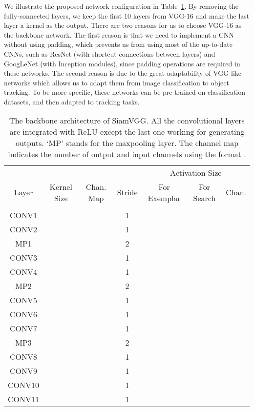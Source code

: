 \documentclass[runningheads]{llncs}
\begin{document}
We illustrate the proposed network configuration in Table~\ref{table:siamvgg}. By removing the fully-connected layers, we keep the first 10 layers from VGG-16 and 
make the last layer a  kernel as the output. There are two reasons for us to choose VGG-16 as the backbone network. The first reason is that we need to implement a CNN without using padding, which prevents us from using most of the up-to-date CNNs, such as ResNet (with shortcut connections between layers) and GoogLeNet (with Inception modules), since padding operations are required in these networks. 
The second reason is due to the great adaptability of VGG-like networks which allows us to adapt them from image classification to object tracking. To be more specific, these networks can be pre-trained on classification datasets, and then adapted to tracking tasks. 
\setlength{\tabcolsep}{4pt}
\begin{table}[t]
\begin{center}
\caption{The backbone architecture of SiamVGG. All the convolutional layers are integrated with ReLU except the last one working for generating outputs. `MP' stands for the maxpooling layer. The channel map indicates the number of output and input channels using the format .}
\label{table:siamvgg}
  \begin{tabular}{ccccccc}
    \toprule
    
       \quad& \quad & \quad
      & \quad &
      \multicolumn{3}{c}{Activation Size} \\
     Layer & Kernel Size & Chan. Map & Stride & For Exemplar & For Search & Chan. \\
      \midrule
    \quad  & \quad        & \quad            & \quad &  &  &  \\
    CONV1  &  &     & 1     &  &  &  \\
    CONV2  &  &    & 1     &  &  &  \\
    MP1    &  & \quad            & 2     &  &  &  \\
    CONV3  &  &   & 1     &  &  &  \\
    CONV4  &  &  & 1     &  &  &  \\
    MP2    &  & \quad            & 2     &  &  &  \\
    CONV5  &  &  & 1     &  &  &  \\
    CONV6  &  &  & 1     &  &  &  \\
    CONV7  &  &  & 1     &  &  &  \\
    MP3    &  & \quad            & 2     &  &  &  \\
    CONV8  &  &  & 1     &  &  &  \\
    CONV9  &  &  & 1     &  &  &  \\
    CONV10 &  &  & 1     &  &  &  \\
    CONV11 &  &  & 1     &  &  &  \\
    \bottomrule
  \end{tabular}
\end{center}
\end{table}
\setlength{\tabcolsep}{1.4pt}
\end{document}
